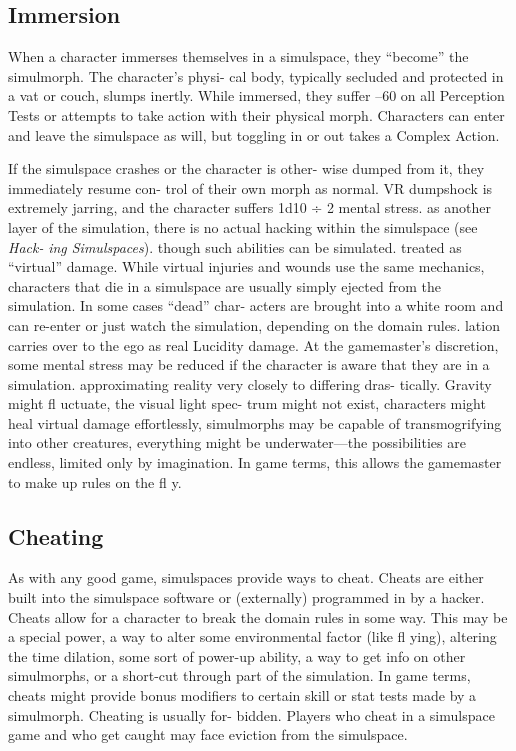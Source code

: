 \subsection{Immersion}

When a character immerses themselves in a simulspace, 
they ``become'' the simulmorph. The character's physi-
cal body, typically secluded and protected in a vat or 
couch, slumps inertly. While immersed, they suffer –60 
on all Perception Tests or attempts to take action with 
their physical morph. Characters can enter and leave 
the simulspace as will, but toggling in or out takes a 
Complex Action.

If the simulspace crashes or the character is other-
wise dumped from it, they immediately resume con-
trol of their own morph as normal. VR dumpshock is 
extremely jarring, and the character suffers 1d10 ÷ 2 
mental stress.
as another layer of the simulation, there is no 
actual hacking within the simulspace (see \textit{Hack-}
\textit{ing Simulspaces}).
though such abilities can be simulated.
treated as ``virtual'' damage. While virtual injuries 
and wounds use the same mechanics, characters 
that die in a simulspace are usually simply ejected 
from the simulation. In some cases ``dead'' char-
acters are brought into a white room and can 
re-enter or just watch the simulation, depending 
on the domain rules.
lation carries over to the ego as real Lucidity 
damage. At the gamemaster's discretion, some 
mental stress may be reduced if the character is 
aware that they are in a simulation.
approximating reality very closely to differing dras-
tically. Gravity might fl uctuate, the visual light spec-
trum might not exist, characters might heal virtual 
damage effortlessly, simulmorphs may be capable of 
transmogrifying into other creatures, everything might 
be underwater—the possibilities are endless, limited 
only by imagination. In game terms, this allows the 
gamemaster to make up rules on the fl y.

\subsection{Cheating}

As with any good game, simulspaces provide ways 
to cheat. Cheats are either built into the simulspace 
software or (externally) programmed in by a hacker. 
Cheats allow for a character to break the domain rules 
in some way. This may be a special power, a way to 
alter some environmental factor (like fl ying), altering 
the time dilation, some sort of power-up ability, a 
way to get info on other simulmorphs, or a short-cut 
through part of the simulation. In game terms, cheats 
might provide bonus modifiers to certain skill or stat 
tests made by a simulmorph. Cheating is usually for-
bidden. Players who cheat in a simulspace game and 
who get caught may face eviction from the simulspace.

